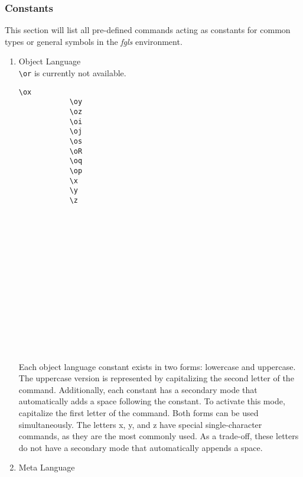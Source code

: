 \documentclass[10pt, a4paper]{article}
\begin{document}
	\subsubsection{Constants}
	This section will list all pre-defined commands acting as constants for common types or general symbols in the \textit{fgls} environment.
	\begin{enumerate}
		\item Object Language\\\verb=\or= is currently not available.
		\begin{center}
			\begin{minipage}[h][4.8cm][t]{15em}
				\begin{lstlisting}[style=B]
			\ox
			\oy
			\oz
			\oi
			\oj
			\os
			\oR
			\oq
			\op
			\x
			\y
			\z
				\end{lstlisting}
			\end{minipage}
			\begin{minipage}[h][4.8cm][t]{15em}
				\begin{fgls}
					\ \\
					\ox\\
					\oy\\
					\oz\\
					\oi\\
					\oj\\
					\os\\
					\oR\\
					\oq\\
					\op\\
					\x\\
					\y\\
					\z
				\end{fgls}
			\end{minipage}
		\end{center}
		Each object language constant exists in two forms: lowercase and uppercase. The uppercase version is represented by capitalizing the second letter of the command. Additionally, each constant has a secondary mode that automatically adds a space following the constant. To activate this mode, capitalize the first letter of the command. Both forms can be used simultaneously. The letters x, y, and z have special single-character commands, as they are the most commonly used. As a trade-off, these letters do not have a secondary mode that automatically appends a space.
		\item Meta Language
		\begin{center}
			\begin{minipage}[h][5.2cm][t]{15em}

\end{minipage}
\end{center}
\end{enumerate}
\end{document}
